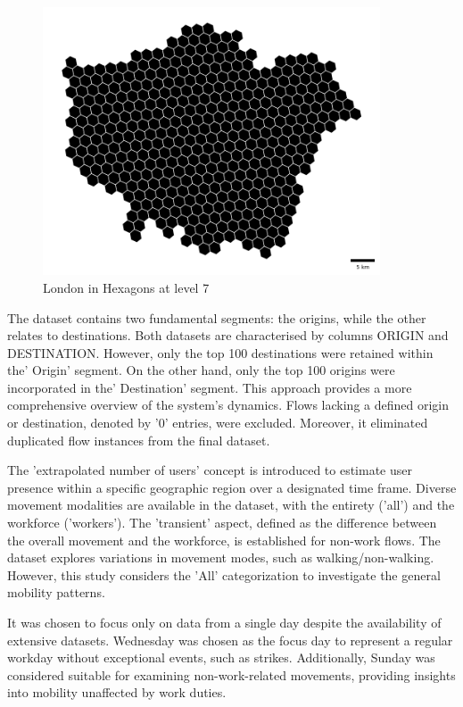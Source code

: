     \begin{figure}[H]
        \centering
        \includegraphics[width=10cm]{Images/Hexagons_level7.png}
        \caption{London in Hexagons at level 7}
        \label{fig: grid 7}
    \end{figure}  
    
The dataset contains two fundamental segments: the origins, while the other relates to destinations. Both datasets are characterised by columns ORIGIN and DESTINATION. However, only the top 100 destinations were retained within the' Origin' segment. On the other hand, only the top 100 origins were incorporated in the' Destination' segment. This approach provides a more comprehensive overview of the system's dynamics. Flows lacking a defined origin or destination, denoted by '0' entries, were excluded. Moreover, it eliminated duplicated flow instances from the final dataset.

The 'extrapolated number of users' concept is introduced to estimate user presence within a specific geographic region over a designated time frame. Diverse movement modalities are available in the dataset, with the entirety ('all') and the workforce ('workers'). The 'transient' aspect, defined as the difference between the overall movement and the workforce, is established for non-work flows. The dataset explores variations in movement modes, such as walking/non-walking. However, this study considers the 'All' categorization to investigate the general mobility patterns.

It was chosen to focus only on data from a single day despite the availability of extensive datasets. Wednesday was chosen as the focus day to represent a regular workday without exceptional events, such as strikes. Additionally, Sunday was considered suitable for examining non-work-related movements, providing insights into mobility unaffected by work duties.

